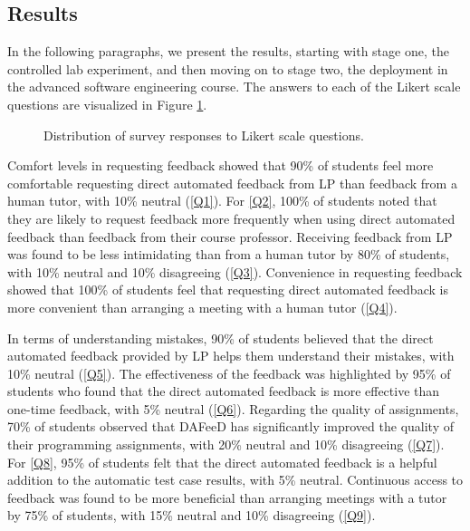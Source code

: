 \documentclass[sigconf,screen,review,anonymous]{acmart}
\begin{document}
\subsection{Results}

In the following paragraphs, we present the results, starting with stage one, the controlled lab experiment, and then moving on to stage two, the deployment in the advanced software engineering course.
The answers to each of the Likert scale questions are visualized in Figure \ref{fig:Survey-Results}.

\begin{figure}[htpb]
  \centering
  \resizebox{\linewidth}{!}{
    
  }
  \vspace{-6mm}
  \caption{Distribution of survey responses to Likert scale questions.}
  \label{fig:Survey-Results}
\end{figure}




Comfort levels in requesting feedback showed that 90\% of students feel more comfortable requesting direct automated feedback from LP than feedback from a human tutor, with 10\% neutral (\ref{Q1}).
For \ref{Q2}, 100\% of students noted that they are likely to request feedback more frequently when using direct automated feedback than feedback from their course professor.
Receiving feedback from LP was found to be less intimidating than from a human tutor by 80\% of students, with 10\% neutral and 10\% disagreeing (\ref{Q3}).
Convenience in requesting feedback showed that 100\% of students feel that requesting direct automated feedback is more convenient than arranging a meeting with a human tutor (\ref{Q4}).


In terms of understanding mistakes, 90\% of students believed that the direct automated feedback provided by LP helps them understand their mistakes, with 10\% neutral (\ref{Q5}).
The effectiveness of the feedback was highlighted by 95\% of students who found that the direct automated feedback is more effective than one-time feedback, with 5\% neutral (\ref{Q6}).
Regarding the quality of assignments, 70\% of students observed that DAFeeD has significantly improved the quality of their programming assignments, with 20\% neutral and 10\% disagreeing (\ref{Q7}).
For \ref{Q8}, 95\% of students felt that the direct automated feedback is a helpful addition to the automatic test case results, with 5\% neutral.
Continuous access to feedback was found to be more beneficial than arranging meetings with a tutor by 75\% of students, with 15\% neutral and 10\% disagreeing (\ref{Q9}).
\end{document}
